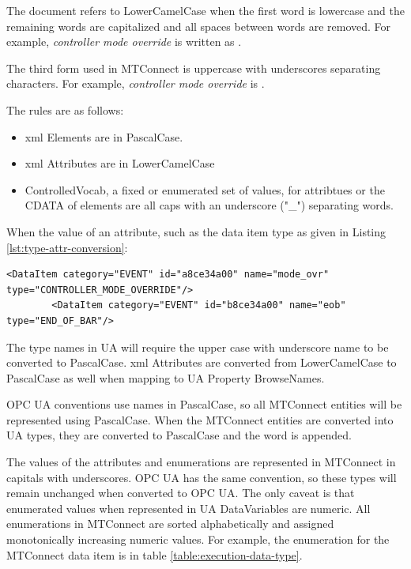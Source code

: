 The document refers to \gls{LowerCamelCase} when the first word is lowercase and the remaining words are capitalized and all spaces between words are removed. For example, \textit{controller mode override} is written as .

The third form used in MTConnect is uppercase with underscores separating characters. For example, \textit{controller mode override} is .

The rules are as follows:
\begin{itemize}
  \item \gls{xml} Elements are in \gls{PascalCase}.
  \item \gls{xml} Attributes are in \gls{LowerCamelCase}
  \item \gls{ControlledVocab}, a fixed or enumerated set of values, for attribtues or the CDATA of elements are all caps with an underscore ("\_") separating words. 
\end{itemize}

When the value of an attribute, such as the data item type as given in Listing \ref{lst:type-attr-conversion}:

\begin{lstlisting}[firstnumber=1,%
    caption={\texttt{DataItem} \texttt{type} Attribtue Conversion}, label={lst:type-attr-conversion}]
        <DataItem category="EVENT" id="a8ce34a00" name="mode_ovr" type="CONTROLLER_MODE_OVERRIDE"/>
        <DataItem category="EVENT" id="b8ce34a00" name="eob" type="END_OF_BAR"/>
\end{lstlisting}

The type names in UA will require the upper case with underscore name to be converted to \gls{PascalCase}. \gls{xml} Attributes are converted from \gls{LowerCamelCase} to \gls{PascalCase} as well when mapping to UA Property \glspl{BrowseName}.

OPC UA conventions use names in \gls{PascalCase}, so all MTConnect entities will be represented using \gls{PascalCase}. When the MTConnect entities are converted into UA types, they are converted to \gls{PascalCase} and the word  is appended. 

The values of the attributes and enumerations are represented in MTConnect in capitals with underscores. OPC UA has the same convention, so these types will remain unchanged when converted to OPC UA. The only caveat is that enumerated values when represented in UA \gls{DataVariable}s are numeric. All enumerations in MTConnect are sorted alphabetically and assigned monotonically increasing numeric values. For example, the enumeration for the  MTConnect data item is in table \ref{table:execution-data-type}.

